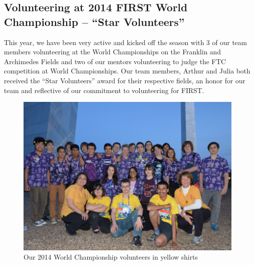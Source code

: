\subsection{Volunteering at 2014 FIRST World Championship – “Star Volunteers”}
This year, we have been very active and kicked off the season with 3 of our team members volunteering at the World Championships on the Franklin and Archimedes Fields and two of our mentors volunteering to judge the FTC competition at World Championships. Our team members, Arthur and Julia both received the “Star Volunteers” award for their respective fields, an honor for our team and reflective of our commitment to volunteering for FIRST.
\begin{figure}[H]
	\centering
	\includegraphics[height=\linewidth]{volunteers}
	\caption[]{Our 2014 World Championship volunteers in yellow shirts}
	\label{fig:volunteers}
\end{figure}


